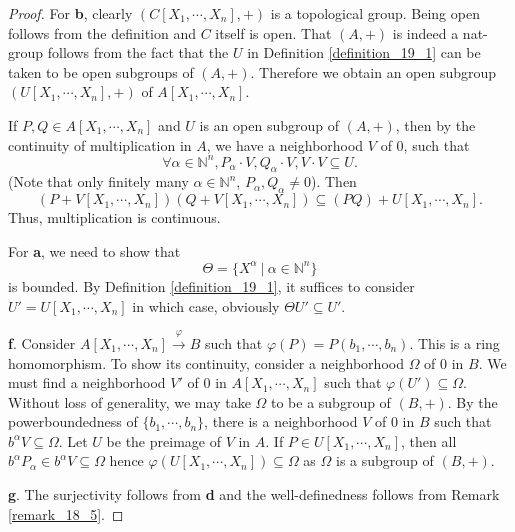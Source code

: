 \documentclass[8pt]{article}
\numberwithin{equation}{section}
\newcommand{\N}[0]{\mathbb{N}}
\newcommand{\sep}[0]{\:|\:}
\begin{document}
\begin{proof}
    For \textbf{b}, clearly $(C[X_1,\cdots,X_n],+)$ is a topological group. Being open follows from the definition and $C$ itself is open.
    That $(A,+)$ is indeed a nat-group follows from the fact that the $U$ in Definition \ref{definition_19_1} can be taken to be open subgroups of $(A,+)$. Therefore we obtain an open subgroup $(U[X_1,\cdots,X_n],+)$ of $A[X_1,\cdots,X_n]$.
    \par If $P,Q\in A[X_1,\cdots,X_n]$ and $U$ is an open subgroup of $(A,+)$, then by the continuity of multiplication in $A$, we have a neighborhood $V$ of $0$, such that 
    \begin{equation*}
        \forall \alpha\in\N^n, P_\alpha\cdot V,Q_\alpha\cdot V, V\cdot V\subseteq U.
    \end{equation*}
    (Note that only finitely many $\alpha\in\N^n$, $P_\alpha,Q_\alpha\not=0$). Then 
    \begin{equation*}
        (P+V[X_1,\cdots,X_n])(Q+V[X_1,\cdots,X_n])\subseteq (PQ)+U[X_1,\cdots,X_n].
    \end{equation*}
    Thus, multiplication is continuous.
    \par For \textbf{a}, we need to show that 
    \begin{equation*}
        \Theta = \{X^\alpha\sep \alpha\in\N^n\}
    \end{equation*}
    is bounded. %
    By Definition \ref{definition_19_1}, it suffices to consider $U'=U[X_1,\cdots,X_n]$ in which case, obviously $\Theta U'\subseteq U'$.
    \par \textbf{f}. Consider $A[X_1,\cdots,X_n]\stackrel{\varphi}{\rightarrow}B$ such that $\varphi(P) = P(b_1,\cdots,b_n)$. This is a ring homomorphism. To show its continuity, consider a neighborhood $\Omega$ of $0$ in $B$. We must find a neighborhood $V'$ of $0$ in $A[X_1,\cdots,X_n]$ such that $\varphi(U')\subseteq\Omega$. Without loss of generality, we may take $\Omega$ to be a subgroup of $(B,+)$.
    By the powerboundedness of $\{b_1,\cdots,b_n\}$, there is a neighborhood $V$ of $0$ in $B$ such that $b^\alpha V\subseteq\Omega$. Let $U$ be the preimage of $V$ in $A$. If $P\in U[X_1,\cdots,X_n]$, then all $ b^\alpha P_\alpha\in b^\alpha V\subseteq\Omega$ hence $\varphi(U[X_1,\cdots,X_n])\subseteq\Omega$ as $\Omega$ is a subgroup of $(B,+)$. 
    \par\textbf{g}. The surjectivity follows from \textbf{d} and the well-definedness follows from Remark \ref{remark_18_5}.%

\end{proof}
\end{document}
